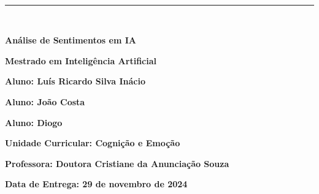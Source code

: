 \documentclass[a4paper,12pt]{report}
\begin{document}
	
	\begin{titlepage}
		\centering
		\vspace*{-2cm} %
		
		\hfill%
		\\[0.5cm]
		
		\noindent
		{\color{barraazul}\rule{\textwidth}{1mm}} %
		\\[1cm]
		
		{\LARGE  \textbf{Análise de Sentimentos em IA} \par}
		\vspace{1.5cm}
		
		{\Large \textbf{Mestrado em Inteligência Artificial}} \par
		\vspace{3cm}
		
		{\large \textbf{Aluno: Luís Ricardo Silva Inácio}} \par
		{\large \textbf{Aluno: João Costa}} \par
		{\large \textbf{Aluno: Diogo}} \par
		
		\vspace{3cm}
		
		{\large \textbf{Unidade Curricular: Cognição e Emoção}} \par
		\vspace{1cm}
		
		{\large \textbf{Professora: Doutora Cristiane da Anunciação Souza}} \par
		\vfill
		
		{\large \textbf{Data de Entrega: 29 de novembro de 2024}} \par
	\end{titlepage}
	
\end{document}

